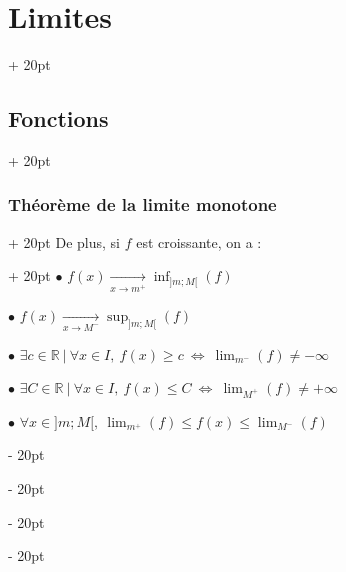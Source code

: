 \documentclass[a4paper, 12pt, twoside]{article}
\newcommand{\R}{\mathbb{R}} %
\newcommand{\tendsto}[1]{\xrightarrow[#1]{}}
\newcommand{\ssi}{\ \Leftrightarrow \ }
\renewcommand{\le}{\leqslant}
\renewcommand{\ge}{\geqslant}
\newcommand{\ind}[1][20pt]{\advance\leftskip + #1}
\newcommand{\deind}[1][20pt]{\advance\leftskip - #1}
\newenvironment{indt}[2][20pt]{#2 \par \ind[#1]}{\par \deind} %
\begin{document}
\begin{indt}{\section{Limites}}
\begin{indt}{\subsection{Fonctions}}
\begin{indt}{\subsubsection{Théorème de la limite monotone}}
                \begin{indt}{De plus, si $f$ est croissante, on a :}
                    $\bullet$ $\displaystyle f(x) \tendsto{x \to m^+} \inf_{]m ; M[}(f)$

                    $\bullet$ $\displaystyle f(x) \tendsto{x \to M^-} \sup_{]m ; M[}(f)$

                    $\bullet$ $\displaystyle \exists c \in \R\ |\ \forall x \in I,\ f(x) \ge c \ssi \lim_{m^-}(f) \neq -\infty$

                    $\bullet$ $\displaystyle \exists C \in \R\ |\ \forall x \in I,\ f(x) \le C \ssi \lim_{M^+}(f) \neq +\infty$

                    $\bullet$ $\displaystyle \forall x \in ]m ; M[,\ \lim_{m^+}(f) \le f(x) \le \lim_{M^-}(f)$
                \end{indt}
            \end{indt}
        \end{indt}
        
    \end{indt}

    \vspace{12pt}
    
\end{document}

